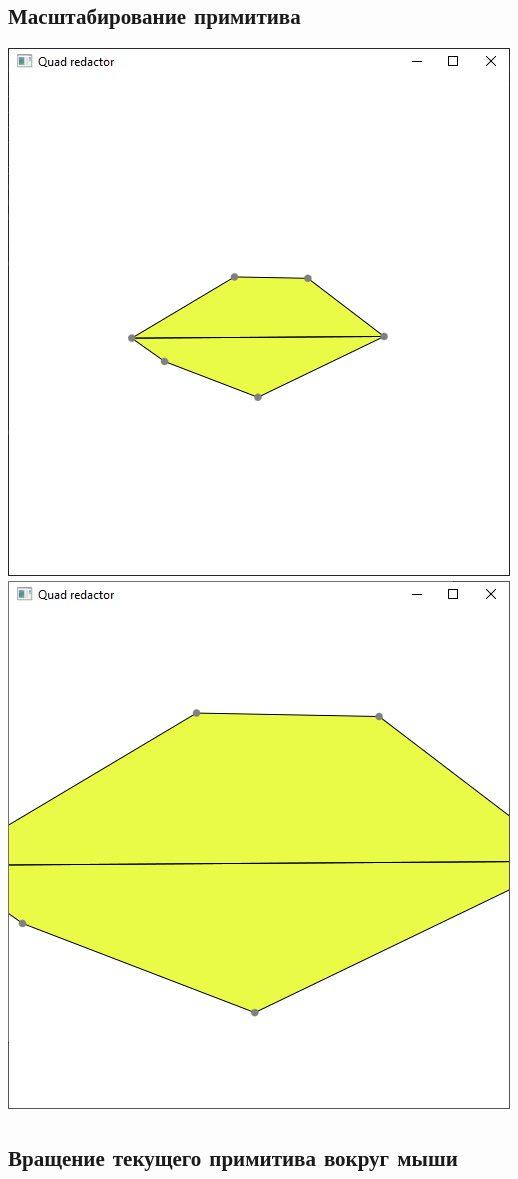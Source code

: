 \subsection{Масштабирование примитива}

\begin{center}
\includegraphics[width=.48\textwidth]{5.png}\includegraphics[width=.48\textwidth]{6.png}
\end{center}

\subsection{Вращение текущего примитива вокруг мыши}

